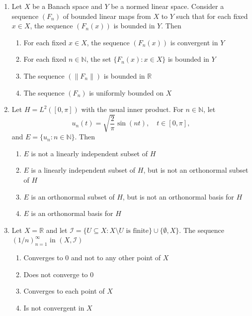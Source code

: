 \documentclass[journal]{IEEEtran}
\numberwithin{equation}{enumi}
\numberwithin{figure}{enumi}
\begin{document}
\begin{enumerate}
\item
Let $X$ be a Banach space and $Y$ be a normed linear space. Consider a sequence $(F_n)$ of bounded linear maps from $X$ to $Y$ such that for each fixed $x \in X$, the sequence $(F_n(x))$ is bounded in $Y$. Then
\hfill{}

\begin{enumerate}
    \item For each fixed $x \in X$, the sequence $(F_n(x))$ is convergent in $Y$
    \item For each fixed $n \in \mathbb{N}$, the set $\{F_n(x) : x \in X \}$ is bounded in $Y$
    \item The sequence $(\|F_n\|)$ is bounded in $\mathbb{R}$
    \item The sequence $(F_n)$ is uniformly bounded on $X$
\end{enumerate}

\item
Let $H = L^2([0, \pi])$ with the usual inner product. For $n \in \mathbb{N}$, let
\[
u_n(t) = \sqrt{\frac{2}{\pi}} \sin(n t), \quad t \in [0, \pi],
\]
and $E = \{u_n : n \in \mathbb{N}\}$. Then
\hfill{}

\begin{enumerate}
    \item $E$ is not a linearly independent subset of $H$
    \item $E$ is a linearly independent subset of $H$, but is not an orthonormal subset of $H$
    \item $E$ is an orthonormal subset of $H$, but is not an orthonormal basis for $H$
    \item $E$ is an orthonormal basis for $H$
\end{enumerate}


\item
Let $X = \mathbb{R}$ and let $\mathcal{I} = \{ U \subseteq X : X \setminus U \text{ is finite}\} \cup \{\emptyset, X\}$. The sequence $(1/n)_{n=1}^\infty$ in $(X, \mathcal{I})$ 
\hfill{}

\begin{enumerate}
    \item Converges to $0$ and not to any other point of $X$
    \item Does not converge to $0$
    \item Converges to each point of $X$
    \item Is not convergent in $X$
\end{enumerate}



\end{enumerate}
\end{document}
